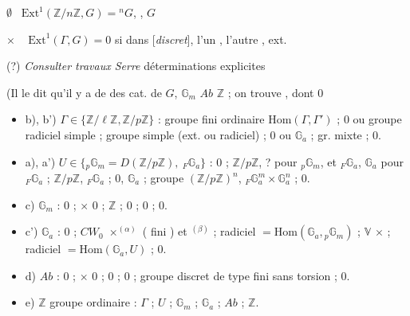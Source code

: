 \documentclass[11pt,a4paper]{article}
\begin{document}
$\emptyset$ \ $\mathrm{Ext}^1(\mathbb{Z}/n\mathbb{Z}, G) = {}^nG$,
, $G$ 

$\times$ \ \struck{\ill{}} $\mathrm{Ext}^1(\Gamma, G) = 0$ si \ill{} dans
\struck{\ill{}} [\emph{discret}], l'un \struck{\ill{}}, l'autre
, \ill{} \ill{} ext. \ill{} \ill{}



(?) \emph{Consulter travaux Serre}  \ill{} déterminations explicites

(Il \ill{} le dit qu'il y a  de  des
cat. de $G$, $\mathbb{G}_m$ \ill{} $Ab$ \ill{} $\mathbb{Z}$ ; on trouve
\ill{} \ill{}, dont 0


\begin{itemize}
\item b), b') $\Gamma \in \lbrace \mathbb{Z}/\ell\mathbb{Z}, \mathbb{Z}/p\mathbb{Z} \rbrace$ :
groupe fini ordinaire \ill{} $\mathrm{Hom}(\Gamma, \Gamma')$ ;
0 ou \struck{\ill{}} groupe radiciel simple ;
groupe simple (ext. ou radiciel) ;
0 ou $\mathbb{G}_a$ ;
gr. \ill{} \ill{} mixte ;
0.
\item a), a') $U \in \lbrace {}_p\mathbb{G}_m = D(\mathbb{Z}/p\mathbb{Z}),\ {}_F\mathbb{G}_a \rbrace$ :
0 ;
$\mathbb{Z}/p\mathbb{Z}$,  ? pour ${}_p\mathbb{G}_m$, et
${}_F\mathbb{G}_a$, $\mathbb{G}_a$ pour ${}_F\mathbb{G}_a$ ;
$\mathbb{Z}/p\mathbb{Z}$, ${}_F\mathbb{G}_a$ ;
0, $\mathbb{G}_a$ ;
groupe $(\mathbb{Z}/p\mathbb{Z})^n$, ${}_F\mathbb{G}_a^m \times \mathbb{G}_a^n$ ;
0.
\item c) $\mathbb{G}_m$ :
0 ; $\times$ 0 ; $\mathbb{Z}$ ; 0 ; 0 ; 0.
\item c') $\mathbb{G}_a$ :
0 ;
$C W_0$ ${}\times^{(\alpha)}$ ( \ill{} \ill{} fini \ill{})
et ${}^{(\beta)}$ \ill{}  \ill{} \ill{} ;
radiciel \ill{} $= \mathrm{Hom}(\mathbb{G}_a, {}_p\mathbb{G}_m)$ ;
$\mathbb{V}$ $\times$ ;
radiciel $= \mathrm{Hom}(\mathbb{G}_a, U)$ ;
0.
\item d) $Ab$  :
0 ; $\times$ 0 ; 0 ; 0 ;
groupe discret \ill{} de type fini sans torsion ;
0.
\item e) $\mathbb{Z}$ groupe ordinaire :
$\Gamma$ ; $U$ ; $\mathbb{G}_m$ ; $\mathbb{G}_a$ ; $Ab$  ; $\mathbb{Z}$.
\end{itemize}
\end{document}
